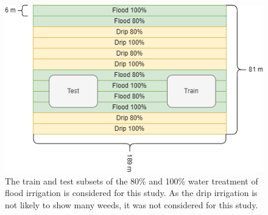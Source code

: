 \documentclass[letterpaper]{report}
\begin{document}
\begin{figure}[h!]
	\centering
	\includegraphics[width=0.8\linewidth]{./figures/test-area.png}
	\caption[Field layout for image acquisition]{The train and test subsets of the 80\% and 100\% water treatment of  flood irrigation is considered for this study. As the drip irrigation is not likely to show many weeds, it was not considered for this study.}
	\label{fig:field-layout}
\end{figure}

\end{document}
